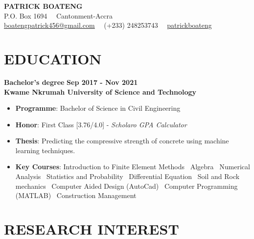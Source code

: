\documentclass[letterpaper, 12pt]{article}
\newcommand{\cvsection}[1]{
	
	\section*{#1}
}
\newcommand{\verticalSpace}{4pt}
\begin{document}
	
	
	\begin{center}
		
	{\huge{\textbf{PATRICK BOATENG}}} \\ [\verticalSpace]
	
	P.O. Box 1694 \, \vrule \, Cantonment-Accra \\ [\verticalSpace]
	
	\faEnvelope \space \href{mailto:boatengpatrick456@gmail.com}{\underline{boatengpatrick456@gmail.com}}
	\, \vrule \,
	\faPhone \space (+233) 248253743
	\, \vrule \,
	 \faGithub \space \href{https://www.github.com/patrickboateng}{\underline{patrickboateng}}
	
	\end{center}
	
	
	\cvsection{EDUCATION} 	
	
	\textbf{Bachelor's degree} \hfill \textbf{Sep 2017 - Nov 2021} \\ [\verticalSpace]
	\textbf{Kwame Nkrumah University of Science and Technology}
	
	\begin{itemize}[leftmargin=*]
		
		\item \textbf{Programme}: Bachelor of Science in Civil Engineering
		\item \textbf{Honor}: First Class [3.76/4.0] - \textit{Scholaro GPA Calculator}
		\item \textbf{Thesis}: Predicting the compressive strength of concrete using machine learning techniques.
		\item \textbf{Key Courses}: Introduction to Finite Element Methods \vrule \, Algebra \vrule \, Numerical Analysis \vrule \, Statistics and Probability \vrule \, Differential Equation \vrule \, Soil and Rock mechanics \vrule \, Computer Aided Design (AutoCad) \vrule \, Computer Programming (MATLAB) \vrule \, Construction Management
	
	\end{itemize}
	
	
	\cvsection{RESEARCH INTEREST}
	
\end{document}
